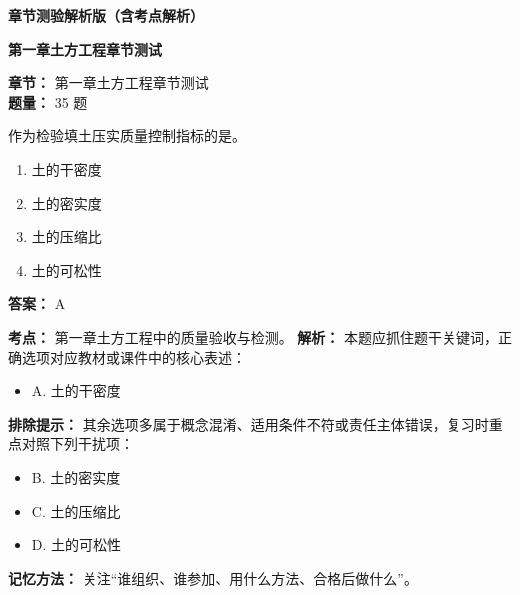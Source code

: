 \documentclass[UTF8,fontset=fandol,11pt]{ctexart}
\newcommand{\chaptertitle}[1]{\vspace{0.5em}\begin{tcolorbox}[enhanced,colback=deepblue,colframe=deepblue,arc=2mm,boxrule=0pt]\begin{center}\Large\bfseries\color{white}#1\end{center}\end{tcolorbox}\vspace{0.5em}}
\begin{document}
\tableofcontents

\newpage

\chaptertitle{章节测验解析版（含考点解析）}

\chaptertitle{第一章土方工程章节测试}
\begin{mainbox}
\textbf{\textcolor{mainblue}{章节：}} 第一章土方工程章节测试\\
\textbf{\textcolor{answerred}{题量：}} 35 题
\end{mainbox}

\begin{quizbox}[title={第 1 题}]
作为检验填土压实质量控制指标的是。\\
\begin{enumerate}[label=\Alph*.]
\item 土的干密度
\item 土的密实度
\item 土的压缩比
\item 土的可松性
\end{enumerate}
\textbf{答案：} A
\vspace{0.25em}
\begin{answerbox}[title={考点解析}]
\textbf{考点：} 第一章土方工程中的质量验收与检测。
\textbf{解析：} 本题应抓住题干关键词，正确选项对应教材或课件中的核心表述：
\begin{itemize}
\item A. 土的干密度
\end{itemize}
\textbf{排除提示：} 其余选项多属于概念混淆、适用条件不符或责任主体错误，复习时重点对照下列干扰项：
\begin{itemize}
\item B. 土的密实度
\item C. 土的压缩比
\item D. 土的可松性
\end{itemize}
\textbf{记忆方法：} 关注“谁组织、谁参加、用什么方法、合格后做什么”。
\end{answerbox}
\end{quizbox}

\vspace{0.2em}
\end{document}
